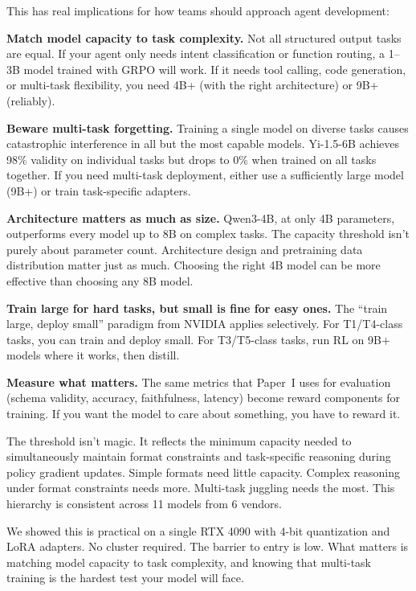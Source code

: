\documentclass[11pt]{article}
\begin{document}
This has real implications for how teams should approach agent development:

\textbf{Match model capacity to task complexity.} Not all structured output tasks are equal.  If your agent only needs intent classification or function routing, a 1--3B model trained with GRPO will work.  If it needs tool calling, code generation, or multi-task flexibility, you need 4B+ (with the right architecture) or 9B+ (reliably).

\textbf{Beware multi-task forgetting.} Training a single model on diverse tasks causes catastrophic interference in all but the most capable models.  Yi-1.5-6B achieves 98\% validity on individual tasks but drops to 0\% when trained on all tasks together.  If you need multi-task deployment, either use a sufficiently large model (9B+) or train task-specific adapters.

\textbf{Architecture matters as much as size.} Qwen3-4B, at only 4B parameters, outperforms every model up to 8B on complex tasks.  The capacity threshold isn't purely about parameter count.  Architecture design and pretraining data distribution matter just as much.  Choosing the right 4B model can be more effective than choosing any 8B model.

\textbf{Train large for hard tasks, but small is fine for easy ones.} The ``train large, deploy small'' paradigm from NVIDIA applies selectively.  For T1/T4-class tasks, you can train and deploy small.  For T3/T5-class tasks, run RL on 9B+ models where it works, then distill.

\textbf{Measure what matters.} The same metrics that Paper~I uses for evaluation (schema validity, accuracy, faithfulness, latency) become reward components for training.  If you want the model to care about something, you have to reward it.

The threshold isn't magic.  It reflects the minimum capacity needed to simultaneously maintain format constraints and task-specific reasoning during policy gradient updates.  Simple formats need little capacity.  Complex reasoning under format constraints needs more.  Multi-task juggling needs the most.  This hierarchy is consistent across 11 models from 6 vendors.

We showed this is practical on a single RTX 4090 with 4-bit quantization and LoRA adapters.  No cluster required.  The barrier to entry is low.  What matters is matching model capacity to task complexity, and knowing that multi-task training is the hardest test your model will face.
\end{document}
